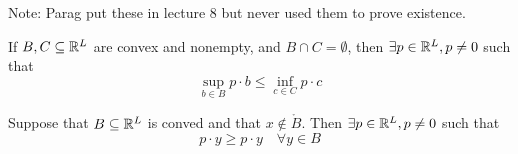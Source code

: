 Note: Parag put these in lecture 8 but never used them to prove
existence.

\begin{theorem}
  If $B, C \subseteq {\mathbb R}^L$ are convex and nonempty, and $B \cap C =
  \emptyset$, then $\exists p \in {\mathbb R}^L, p \neq 0$ such that
  \[
  \sup_{b \in B} p \cdot b \leq \inf_{c \in C} p \cdot c
  \]
\end{theorem}

\begin{theorem}
  Suppose that $B \subseteq {\mathbb R}^L$ is conved and that $x \not\in
  \mathring B$. Then $\exists p \in {\mathbb R}^L, p \neq 0$ such that 
  \[
  p \cdot y \geq p \cdot y \quad \forall y \in B
  \]
\end{theorem}


